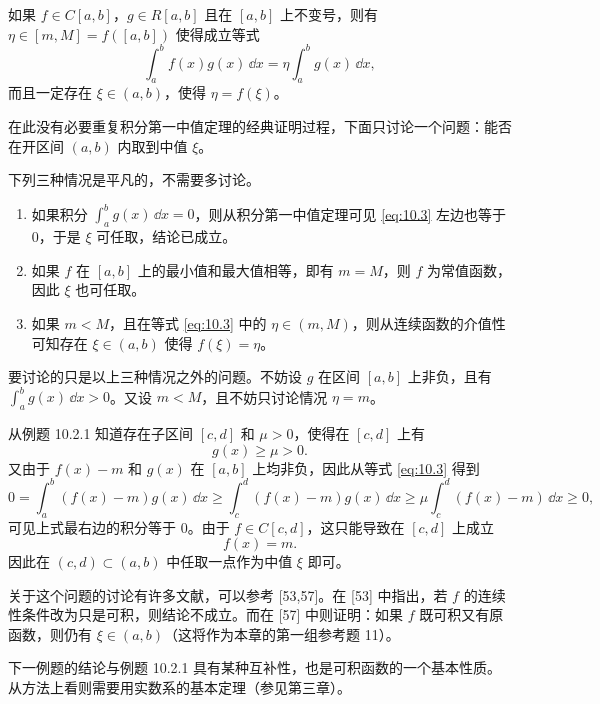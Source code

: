 \begin{xexample}[10.2.2（对积分第一中值定理的改进）]
如果 $f\in C[a,b]$，$g\in R[a,b]$ 且在 $[a,b]$ 上不变号，则有 $\eta\in[m,M]=f([a,b])$ 使得成立等式
\begin{equation}
  \int_a^b f(x)g(x)\,\dd x=\eta\int_a^b g(x)\,\dd x,
  \tag{10.3}
  \label{eq:10.3}
\end{equation}
而且一定存在 $\xi\in(a,b)$，使得 $\eta=f(\xi)$。
\end{xexample}
\begin{xsolution}
在此没有必要重复积分第一中值定理的经典证明过程，下面只讨论一个问题：能否在开区间 $(a,b)$ 内取到中值 $\xi$。

下列三种情况是平凡的，不需要多讨论。
\begin{enumerate}
  \item 如果积分 $\int_a^b g(x)\,\dd x=0$，则从积分第一中值定理可见 \eqref{eq:10.3} 左边也等于 0，于是 $\xi$ 可任取，结论已成立。
  \item 如果 $f$ 在 $[a,b]$ 上的最小值和最大值相等，即有 $m=M$，则 $f$ 为常值函数，因此 $\xi$ 也可任取。
  \item 如果 $m<M$，且在等式 \eqref{eq:10.3} 中的 $\eta\in(m,M)$，则从连续函数的介值性可知存在 $\xi\in(a,b)$ 使得 $f(\xi)=\eta$。
\end{enumerate}
要讨论的只是以上三种情况之外的问题。不妨设 $g$ 在区间 $[a,b]$ 上非负，且有 $\int_a^b g(x)\,\dd x>0$。又设 $m<M$，且不妨只讨论情况 $\eta=m$。

从例题 10.2.1 知道存在子区间 $[c,d]$ 和 $\mu>0$，使得在 $[c,d]$ 上有
\begin{equation}
  g(x)\geqslant\mu>0.
  \tag{10.4}
  \label{eq:10.4}
\end{equation}
又由于 $f(x)-m$ 和 $g(x)$ 在 $[a,b]$ 上均非负，因此从等式 \eqref{eq:10.3} 得到
\[
  0=\int_a^b(f(x)-m)g(x)\,\dd x
  \geqslant\int_c^d(f(x)-m)g(x)\,\dd x
  \geqslant\mu\int_c^d(f(x)-m)\,\dd x\geqslant0,
\]
可见上式最右边的积分等于 0。由于 $f\in C[c,d]$，这只能导致在 $[c,d]$ 上成立
\[
  f(x)=m.
\]
因此在 $(c,d)\subset(a,b)$ 中任取一点作为中值 $\xi$ 即可。
\end{xsolution}

\begin{xremark}
关于这个问题的讨论有许多文献，可以参考 [53,57]。在 [53] 中指出，若 $f$ 的连续性条件改为只是可积，则结论不成立。而在 [57] 中则证明：如果 $f$ 既可积又有原函数，则仍有 $\xi\in(a,b)$（这将作为本章的第一组参考题 11）。

下一例题的结论与例题 10.2.1 具有某种互补性，也是可积函数的一个基本性质。从方法上看则需要用实数系的基本定理（参见第三章）。
\end{xremark}

